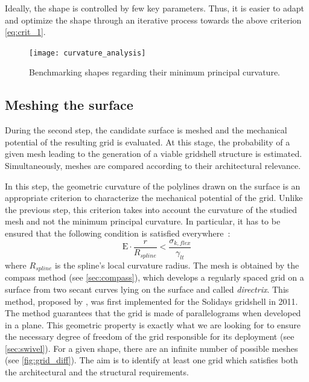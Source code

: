 Ideally, the shape is controlled by few key parameters. Thus, it is easier to adapt and optimize the shape through an iterative process towards the above criterion \cref{eq:crit_1}.

\begin{figure}[t]
\centering
\texttt{[image: curvature\_analysis]}
\caption[Benchmarking shapes regarding their curvature]{Benchmarking shapes regarding their minimum principal curvature.}
\label{fig:shape_bench}
\end{figure}

\subsection{Meshing the surface}
During the second step, the candidate surface is meshed and the mechanical potential of the resulting grid is evaluated. At this stage, the probability of a given mesh leading to the generation of a viable gridshell structure is estimated. Simultaneously, meshes are compared according to their architectural relevance.

In this step, the geometric curvature of the polylines drawn on the surface is an appropriate criterion to characterize the mechanical potential of the grid. Unlike the previous step, this criterion takes into account the curvature of the studied mesh and not the minimum principal curvature. In particular, it has to be ensured that the following condition is satisfied everywhere~:
\begin{equation}
	\mathrm{E} \cdot   \frac{r}{R_{spline}}  <   \frac{\sigma_{k,flex}}{\gamma_{lt}}
	\label{eq:crit_2}
\end{equation}
where $R_{spline}$ is the spline’s local curvature radius. The mesh is obtained by the compass method (see \cref{sec:compass}), which develops a regularly spaced grid on a surface from two secant curves lying on the surface and called \emph{directrix}. This method, proposed by \citet{Otto1974}, was first implemented for the Solidays gridshell in 2011. The method guarantees that the grid is made of parallelograms when developed in a plane. This geometric property is exactly what we are looking for to ensure the necessary degree of freedom of the grid responsible for its deployment (see \cref{sec:swivel}). For a given shape, there are an infinite number of possible meshes (see \cref{fig:grid_diff}). The aim is to identify at least one grid which satisfies both the architectural and the structural requirements. 

